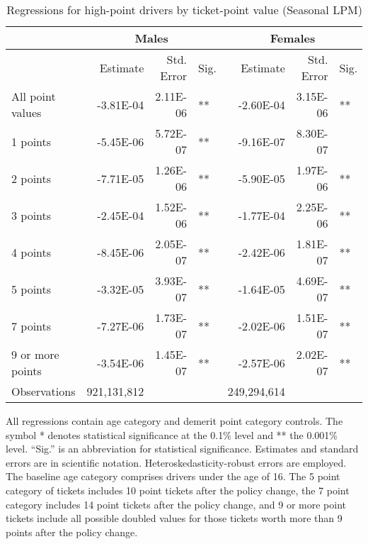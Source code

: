 
\begin{table}%
\centering 
\begin{tabular}{l r r l r r l} 

\hline 
 
 & \multicolumn{3}{c}{Males} & \multicolumn{3}{c}{Females} \\ 

\hline 
 
 & Estimate & Std. Error & Sig. & Estimate & Std. Error & Sig. \\ 

\hline 
 
All point values                &  -3.81E-04        &  2.11E-06       &   **       &  -2.60E-04        &  3.15E-06       &   **       \\ 
1 points                        &  -5.45E-06        &  5.72E-07       &   **       &  -9.16E-07        &  8.30E-07       &            \\ 
2 points                        &  -7.71E-05        &  1.26E-06       &   **       &  -5.90E-05        &  1.97E-06       &   **       \\ 
3 points                        &  -2.45E-04        &  1.52E-06       &   **       &  -1.77E-04        &  2.25E-06       &   **       \\ 
4 points                        &  -8.45E-06        &  2.05E-07       &   **       &  -2.42E-06        &  1.81E-07       &   **       \\ 
5 points                        &  -3.32E-05        &  3.93E-07       &   **       &  -1.64E-05        &  4.69E-07       &   **       \\ 
7 points                        &  -7.27E-06        &  1.73E-07       &   **       &  -2.02E-06        &  1.51E-07       &   **       \\ 
9 or more points                &  -3.54E-06        &  1.45E-07       &   **       &  -2.57E-06        &  2.02E-07       &   **       \\ 
Observations            & 921,131,812    &          &              &  249,294,614 \\ 


\hline 

\end{tabular} 
\caption{Regressions for high-point drivers by ticket-point value (Seasonal LPM)} 
All regressions contain age category and demerit point category controls. 
The symbol * denotes statistical significance at the 0.1\% level 
and ** the 0.001\% level. 
``Sig.'' is an abbreviation for statistical significance. 
Estimates and standard errors are in scientific notation. 
Heteroskedasticity-robust errors are employed. 
The baseline age category comprises drivers under the age of 16. 
The 5 point category of tickets includes 10 point tickets after the policy change,  
the 7 point category includes 14 point tickets after the policy change,  
and 9 or more point tickets include all possible doubled values for those tickets  
worth more than 9 points after the policy change. 
\label{tab:seas_regs_by_points} 
\end{table} 
 
